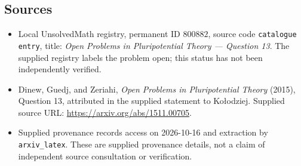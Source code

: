 \documentclass[11pt]{article}
\begin{document}
\subsection{Sources}
\begin{itemize}
\item Local UnsolvedMath registry, permanent ID \(800882\), source code \texttt{catalogue entry}, title: \emph{Open Problems in Pluripotential Theory --- Question 13}. The supplied registry labels the problem open; this status has not been independently verified.
\item Dinew, Guedj, and Zeriahi, \emph{Open Problems in Pluripotential Theory} (2015), Question 13, attributed in the supplied statement to Ko\l{}odziej. Supplied source URL: \url{https://arxiv.org/abs/1511.00705}.
\item Supplied provenance records access on 2026-10-16 and extraction by \texttt{arxiv\_latex}. These are supplied provenance details, not a claim of independent source consultation or verification.
\end{itemize}
\end{document}
